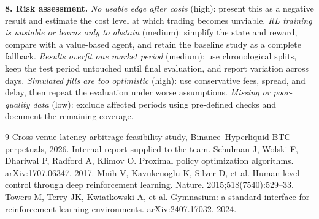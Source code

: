 \documentclass[10pt,a4paper]{article}
\begin{document}
\textbf{8. Risk assessment.}
\emph{No usable edge after costs} (high): present this as a negative result and estimate the
cost level at which trading becomes unviable.
\emph{RL training is unstable or learns only to abstain} (medium): simplify the state and
reward, compare with a value-based agent, and retain the baseline study as a complete
fallback.
\emph{Results overfit one market period} (medium): use chronological splits, keep the test
period untouched until final evaluation, and report variation across days.
\emph{Simulated fills are too optimistic} (high): use conservative fees, spread, and delay,
then repeat the evaluation under worse assumptions.
\emph{Missing or poor-quality data} (low): exclude affected periods using pre-defined checks
and document the remaining coverage.

\newpage
\begin{thebibliography}{9}\small
{} Cross-venue latency arbitrage feasibility study, Binance--Hyperliquid BTC perpetuals, 2026. Internal report supplied to the team.
 Schulman J, Wolski F, Dhariwal P, Radford A, Klimov O. Proximal policy optimization algorithms. arXiv:1707.06347. 2017.
 Mnih V, Kavukcuoglu K, Silver D, et al. Human-level control through deep reinforcement learning. Nature. 2015;518(7540):529--33.
 Towers M, Terry JK, Kwiatkowski A, et al. Gymnasium: a standard interface for reinforcement learning environments. arXiv:2407.17032. 2024.
\end{thebibliography}
\end{document}
